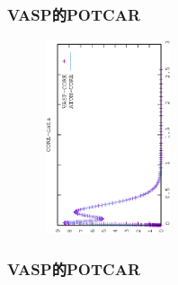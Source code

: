 {\frame
{
	\frametitle{\rm{VASP}的\rm{POTCAR}}
\begin{minipage}{0.58\textwidth}
\centering
\vspace{-0.10in}
\fontsize{3.3pt}{1.9pt}\selectfont{
}
\end{minipage}
\hfill
\begin{minipage}{0.40\textwidth}
\begin{figure}[t!]
\centering
\vspace{-0.05in}
\includegraphics[height=2.25in,width=1.5in,viewport=0 0 350 550, angle=-90, clip]{Figures/CORE-data.eps}
\label{core_density_Function}
\end{figure}
\end{minipage}
}

\frame
{
	\frametitle{\rm{VASP}的\rm{POTCAR}}
\centering
\vspace{-0.15in}
\fontsize{3.3pt}{1.9pt}\selectfont{
}
}

}
